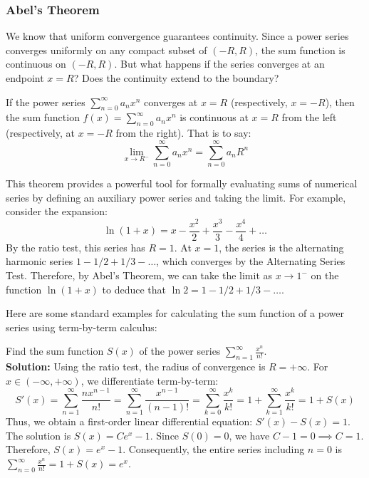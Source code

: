 \subsubsection{Abel's Theorem}

We know that uniform convergence guarantees continuity. Since a power series converges uniformly on any compact subset of $(-R, R)$, the sum function is continuous on $(-R, R)$. But what happens if the series converges at an endpoint $x=R$? Does the continuity extend to the boundary?

\begin{theorem}
If the power series $\sum_{n=0}^{\infty} a_n x^n$ converges at $x = R$ (respectively, $x = -R$), then the sum function $f(x) = \sum_{n=0}^{\infty} a_n x^n$ is continuous at $x = R$ from the left (respectively, at $x = -R$ from the right). That is to say:
\[ \lim_{x \to R^-} \sum_{n=0}^{\infty} a_n x^n = \sum_{n=0}^{\infty} a_n R^n \]
\end{theorem}

This theorem provides a powerful tool for formally evaluating sums of numerical series by defining an auxiliary power series and taking the limit. For example, consider the expansion:
\[ \ln(1+x) = x - \frac{x^2}{2} + \frac{x^3}{3} - \frac{x^4}{4} + \dots \]
By the ratio test, this series has $R=1$. At $x=1$, the series is the alternating harmonic series $1 - 1/2 + 1/3 - \dots$, which converges by the Alternating Series Test. Therefore, by Abel's Theorem, we can take the limit as $x \to 1^-$ on the function $\ln(1+x)$ to deduce that $\ln 2 = 1 - 1/2 + 1/3 - \dots$.

Here are some standard examples for calculating the sum function of a power series using term-by-term calculus:

\begin{example}
Find the sum function $S(x)$ of the power series $\sum_{n=1}^{\infty} \frac{x^n}{n!}$.
\\ \textbf{Solution:} Using the ratio test, the radius of convergence is $R = +\infty$. For $x \in (-\infty, +\infty)$, we differentiate term-by-term:
\[ S'(x) = \sum_{n=1}^{\infty} \frac{n x^{n-1}}{n!} = \sum_{n=1}^{\infty} \frac{x^{n-1}}{(n-1)!} = \sum_{k=0}^{\infty} \frac{x^k}{k!} = 1 + \sum_{k=1}^{\infty} \frac{x^k}{k!} = 1 + S(x) \]
Thus, we obtain a first-order linear differential equation: $S'(x) - S(x) = 1$. The solution is $S(x) = C e^x - 1$.
Since $S(0) = 0$, we have $C - 1 = 0 \implies C = 1$. Therefore, $S(x) = e^x - 1$.
Consequently, the entire series including $n=0$ is $\sum_{n=0}^{\infty} \frac{x^n}{n!} = 1 + S(x) = e^x$.
\end{example}

